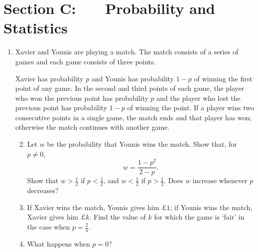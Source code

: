 \documentclass[a4, 11pt]{report}
\newlength{\qspace}
\newcounter{qnumber}
\newenvironment{question}%
 {\vspace{\qspace}
  \begin{enumerate}[\bfseries 1\quad][10]%
    \setcounter{enumi}{\value{qnumber}}%
    \item%
 }
{
  \end{enumerate}
  \filbreak
  \stepcounter{qnumber}
 }
\newenvironment{questionparts}[1][1]%
 {
  \begin{enumerate}[\bfseries (i)]%
    \setcounter{enumii}{#1}
    \addtocounter{enumii}{-1}
    \setlength{\itemsep}{5mm}
    \setlength{\parskip}{8pt}
 }
 {
  \end{enumerate}
 }
\begin{document}
	
	\newpage
\section*{Section C: \ \ \ Probability and Statistics}


\begin{question}
Xavier and Younis are playing a match.
The match consists of a series of games and 
 each game consists of three points.


Xavier has
probability $p$ 
and Younis has probability $1-p$
of winning the first point of any game.
In the second and third points of each game,
the player who won the previous point
 has
probability $p$ 
and the player who lost the previous point
 has probability $1-p$
of winning the  point.
If a player wins two consecutive points in a single game,
the match ends and that player has won; otherwise the 
match continues with another game.


\begin{questionparts}
\item Let $w$ be the probability that Younis wins the match.
 Show that, for $p\ne0$, 
\[
w = \frac{1-p^2}{2-p}.
\]
Show that $w>\frac12$ if $p<\frac12$, and $w<\frac12$ if $p>\frac12$. Does $w$ increase whenever 
$p$ decreases? 

\item If Xavier wins the match, Younis gives him $\pounds1$; if 
Younis wins the match, Xavier gives him $\pounds k$.
      Find the value of $k$ for which the game is `fair' 
in the case when  $p =\frac23$.

\item What happens when  $p = 0$?
\end{questionparts}
\end{question}
\end{document}
